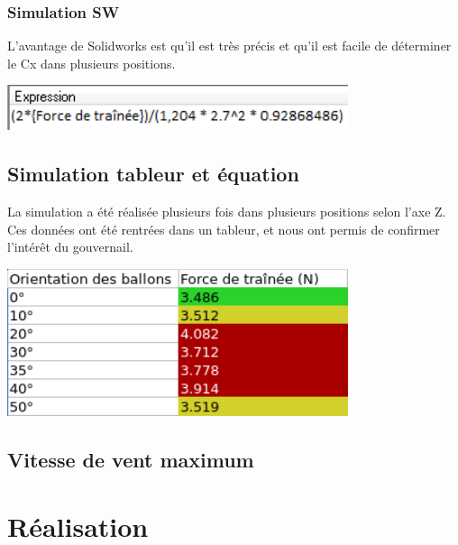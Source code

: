 \documentclass[a4paper,11pt]{article}
\begin{document}
\subsubsection{Simulation SW}
	L'avantage de Solidworks est qu'il est très précis et qu'il est facile de déterminer le Cx dans plusieurs positions.\\
	\begin{center}
		\includegraphics[width=10cm]{../Images/expressionCX.png}
	\end{center}

\subsection{Simulation tableur et équation}
	La simulation a été réalisée plusieurs fois dans plusieurs positions selon l'axe Z.\\
	Ces données ont été rentrées dans un tableur, et nous ont permis de confirmer l'intérêt du gouvernail.\\
	\begin{center}
    \includegraphics[width=10cm]{../Images/resultatsSW.png} \\
	\end{center}

\subsection{Vitesse de vent maximum}

\section{Réalisation}
\end{document}
